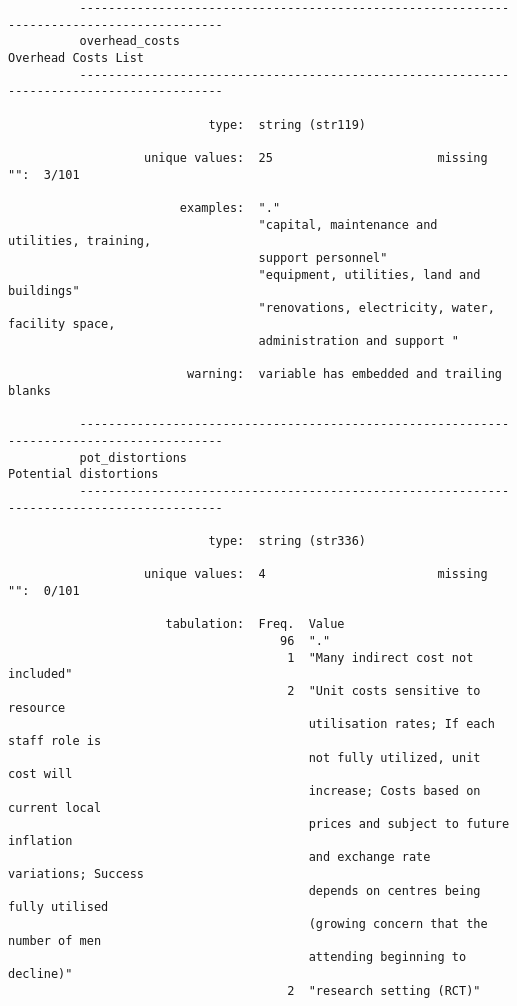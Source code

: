\documentclass{article}
\begin{document}
\begin{verbatim}
          ------------------------------------------------------------------------------------------
          overhead_costs                                                         Overhead Costs List
          ------------------------------------------------------------------------------------------
          
                            type:  string (str119)
          
                   unique values:  25                       missing "":  3/101
          
                        examples:  "."
                                   "capital, maintenance and utilities, training,
                                   support personnel"
                                   "equipment, utilities, land and buildings"
                                   "renovations, electricity, water, facility space,
                                   administration and support "
          
                         warning:  variable has embedded and trailing blanks
          
          ------------------------------------------------------------------------------------------
          pot_distortions                                                      Potential distortions
          ------------------------------------------------------------------------------------------
          
                            type:  string (str336)
          
                   unique values:  4                        missing "":  0/101
          
                      tabulation:  Freq.  Value
                                      96  "."
                                       1  "Many indirect cost not included"
                                       2  "Unit costs sensitive to resource
                                          utilisation rates; If each staff role is
                                          not fully utilized, unit cost will
                                          increase; Costs based on current local
                                          prices and subject to future inflation
                                          and exchange rate variations; Success
                                          depends on centres being fully utilised
                                          (growing concern that the number of men
                                          attending beginning to decline)"
                                       2  "research setting (RCT)"
          

\end{verbatim}
\end{document}
